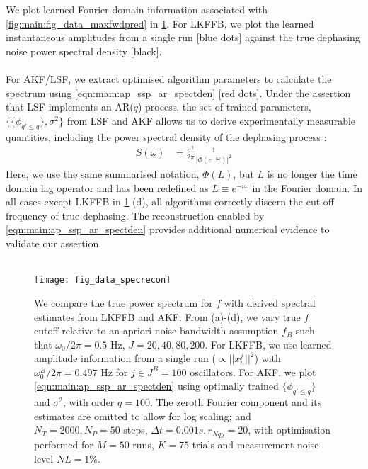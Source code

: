 We plot learned Fourier domain information associated with \cref{fig:main:fig_data_maxfwdpred} in \cref{fig:main:fig_data_specrecon}. For LKFFB, we plot the learned instantaneous amplitudes from a single run [blue dots] against the true dephasing noise power spectral density [black]. 
\\
\\
For AKF/LSF, we extract optimised algorithm parameters to calculate the spectrum using \cref{eqn:main:ap_ssp_ar_spectden} [red dots]. Under the assertion that LSF implements an AR($q$) process, the set of trained parameters, $\{  \{\phi_{q' \leq q}\}, \sigma^2\}$ from LSF and AKF allows us to derive experimentally measurable quantities, including the power spectral density of the dephasing process \cite{brockwell1996introduction}:
\begin{align}
S(\omega) & = \frac{\sigma^2}{2 \pi }\frac{1}{|\Phi(e^{-i\omega})|^2} \label{eqn:main:ap_ssp_ar_spectden} 
\end{align}
Here, we use the same summarised notation, $\Phi(L)$, but  $L$ is no longer the time domain lag operator and has been redefined as $L \equiv e^{-i\omega}$ in the Fourier domain. In all cases except LKFFB in \cref{fig:main:fig_data_specrecon} (d), all algorithms correctly discern the cut-off frequency of true dephasing. The reconstruction enabled by \cref{eqn:main:ap_ssp_ar_spectden} provides additional numerical evidence to validate our assertion. 
\\
\\
\begin{figure}
    \texttt{[image: fig\_data\_specrecon]}
    \caption{\label{fig:main:fig_data_specrecon} We compare the true power spectrum for $f$ with derived spectral estimates from LKFFB and AKF. From (a)-(d), we vary true $f$ cutoff relative to an apriori noise bandwidth assumption $f_B$ such that $\omega_0 / 2\pi = 0.5$ Hz, $J = 20, 40, 80, 200$. For LKFFB, we use learned amplitude information from a single run ($\propto ||x^j_n||^2 $) with $\omega_0^B / 2\pi = 0.497$ Hz for $j \in J^B = 100$ oscillators. For AKF, we plot \cref{eqn:main:ap_ssp_ar_spectden} using optimally trained $\{\phi_{q' \leq q}\}$ and $\sigma^2$, with order $q = 100$. The zeroth Fourier component and its estimates are omitted to allow for log scaling; and $N_T = 2000, N_P = 50$ steps, $\Delta t = 0.001s, r_{Nqy}=20$, with optimisation performed for $M=50$ runs, $K=75$ trials and measurement noise level $NL = 1\%$.} 
\end{figure} 
